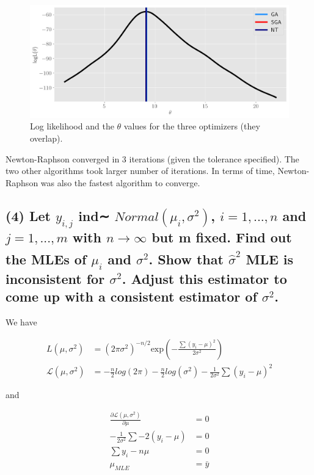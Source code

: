 \documentclass[11pt]{article}
\begin{document}
\begin{figure}[!h]
    \centering
    \includegraphics[scale=.55]{homework_2/figures/cauchy_loglike.png}
    \caption{Log likelihood and the $\theta$ values for the three optimizers (they overlap).}
    \label{fig:my_label}
\end{figure}

Newton-Raphson converged in 3 iterations (given the tolerance specified). The two other algorithms took larger number of iterations. In terms of time, Newton-Raphson was also the fastest algorithm to converge.
\newpage
\clearpage
\subsection*{(4) Let $y_{i,j}$
ind∼ $Normal(\mu_i,\sigma^2)$, $i = 1,...,n$ and $j = 1,...,m$ with $n \xrightarrow[]{} \infty$
but m fixed. Find out the MLEs of $\mu_i$ and $\sigma^2$. Show that  $\hat{\sigma}^2$ MLE is inconsistent for $\sigma^2$. Adjust this estimator to come up with a consistent estimator of  $\sigma^2$.}

We have

\begin{align*}
    L(\mu, \sigma^2) &=  (2\pi \sigma^2)^{-n/2} \text{exp} \left(- \frac{\sum(y_i-\mu)^2}{2\sigma^2}\right)\\
    \mathcal{L}(\mu, \sigma^2) &= -\frac{n}{2}log(2\pi)  -\frac{n}{2}log(\sigma^2)  -\frac{1}{2\sigma^2}\sum(y_i-\mu)^2
\end{align*}

and 

\begin{align*}
    \frac{\partial \mathcal{L}(\mu, \sigma^2)}{\partial \mu} &= 0 \\
    -\frac{1}{2\sigma^2} \sum -2(y_i-\mu)&= 0 \\
     \sum y_i-n\mu&= 0 \\
     \mu_{MLE}&= \bar{y} \\
\end{align*}
\end{document}
